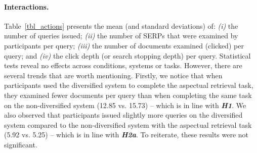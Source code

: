 \paragraph{Interactions.} Table~\ref{tbl_actions} presents the mean (and standard deviations) of: \textit{(i)} the number of queries issued; \textit{(ii)} the number of SERPs that were examined by participants per query; \textit{(iii)} the number of documents examined (clicked) per query; and \textit{(iv)} the click depth (or search stopping depth) per query. %
Statistical tests reveal no effects across conditions, systems or tasks. However, there are several trends that are worth mentioning. Firstly, we notice that when participants used the diversified system to complete the aspectual retrieval task, they examined fewer documents per query than when completing the same task on the non-diversified system (12.85 vs. 15.73) -- which is in line with \emph{\textbf{H1}}. We also observed that participants issued slightly more queries on the diversified system compared to the non-diversified system with the aspectual retrieval task (5.92 vs. 5.25) -- which is in line with \emph{\textbf{H2a}}. To reiterate, these results were not significant.



